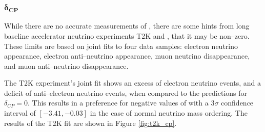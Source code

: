 \subsubsection*{$\boldsymbol{\delta_{CP}}$}
While there are no accurate measurements of \dcp{}, there are some hints from
long baseline accelerator neutrino experiments T2K and \nova{}, that it
may be non--zero. These limits are based on joint fits to four data samples: 
electron neutrino appearance, electron anti--neutrino appearance, muon 
neutrino disappearance, and muon anti--neutrino disappearance.

The T2K experiment's joint fit shows an excess of electron neutrino events, and 
a deficit of anti--electron neutrino events, when compared to the predictions 
for \(\delta_{CP} = 0\). This results in a preference for negative values of 
\dcp{} with a \(3\sigma\) confidence interval of \([-3.41, -0.03]\) in the 
case of normal neutrino mass ordering. The results of the T2K fit are shown 
in Figure \ref{fig:t2k_cp}\cite{Abe2019}.


